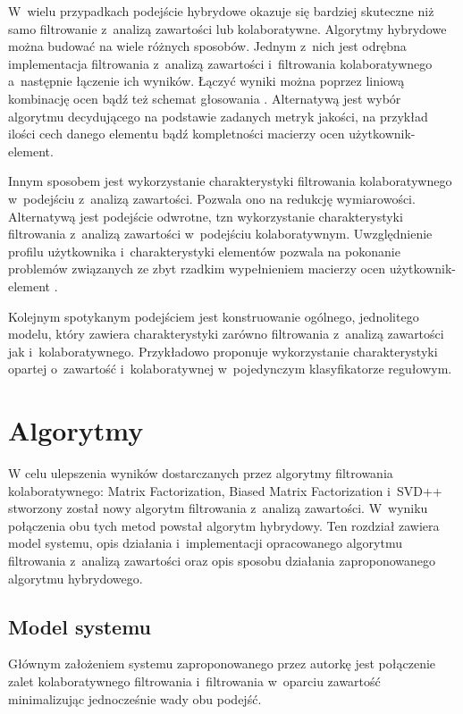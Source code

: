 \documentclass[twoside]{iisthesis}
\begin{document}
	 W~wielu przypadkach podejście hybrydowe okazuje się bardziej skuteczne niż samo filtrowanie z~analizą zawartości lub kolaboratywne. Algorytmy hybrydowe można budować na wiele różnych sposobów. Jednym z~nich jest odrębna implementacja filtrowania z~analizą zawartości i~filtrowania kolaboratywnego a~następnie łączenie ich wyników. Łączyć wyniki można poprzez liniową kombinację ocen bądź też schemat głosowania \cite{claypool1999combining}. Alternatywą jest wybór algorytmu decydującego na podstawie zadanych metryk jakości, na przykład ilości cech danego elementu bądź kompletności macierzy ocen użytkownik-element.
	 
	 Innym sposobem jest wykorzystanie charakterystyki filtrowania kolaboratywnego w~podejściu z~analizą zawartości. Pozwala ono na redukcję wymiarowości. Alternatywą jest podejście odwrotne, tzn wykorzystanie charakterystyki filtrowania z~analizą zawartości w~podejściu kolaboratywnym. Uwzględnienie profilu użytkownika i~charakterystyki elementów pozwala na pokonanie problemów związanych ze zbyt rzadkim wypełnieniem macierzy ocen użytkownik-element \cite{adomavicius2005toward}.
	 
	 Kolejnym spotykanym podejściem jest konstruowanie ogólnego, jednolitego modelu, który zawiera charakterystyki zarówno filtrowania z~analizą zawartości jak i~kolaboratywnego.
	 Przykładowo \cite{basu1998recommendation} proponuje wykorzystanie charakterystyki opartej o~zawartość i~kolaboratywnej w~pojedynczym klasyfikatorze regułowym.
	 

 \chapter{Algorytmy}


	W celu ulepszenia wyników dostarczanych przez algorytmy filtrowania kolaboratywnego: Matrix Factorization, Biased Matrix Factorization i~SVD++ stworzony został nowy algorytm filtrowania z~analizą zawartości. W~wyniku połączenia obu tych metod powstał algorytm hybrydowy. Ten rozdział zawiera model systemu, opis działania i~implementacji opracowanego algorytmu filtrowania z~analizą zawartości oraz opis sposobu działania zaproponowanego algorytmu hybrydowego.

	\section{Model systemu}
	
	Głównym założeniem systemu zaproponowanego przez autorkę jest połączenie zalet kolaboratywnego filtrowania i~filtrowania w~oparciu zawartość minimalizując jednocześnie wady obu podejść. 
	
\end{document}

